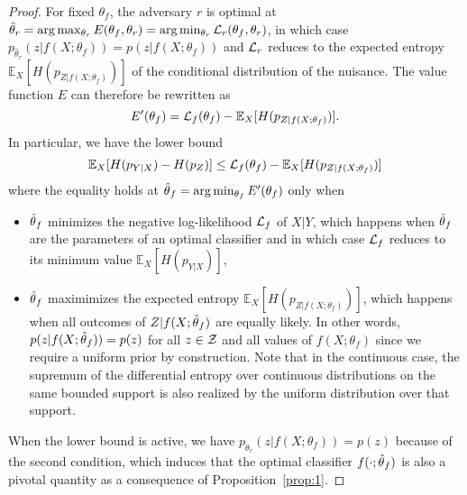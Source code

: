 \documentclass[twocolumn,superscriptaddress,aps]{revtex4-1}
\theoremstyle{plain}
\begin{document}
\begin{proof}

For fixed $\theta_f$, the adversary $r$ is optimal at $\hat\theta_r = \arg
\max_{\theta_r} E(\theta_f, \theta_r)  = \arg \min_{\theta_r} {\cal
L}_r(\theta_f, \theta_r)$, in which case $p_{\hat\theta_r}(z|f(X;\theta_f)) =
p(z|f(X;\theta_f))$ and ${\cal L}_r$ reduces to the expected entropy
$\mathbb{E}_{X} [ H(p_{Z|f(X;\theta_f)}) ]$ of the conditional distribution of the nuisance. The
value function $E$ can therefore be rewritten as $$E'(\theta_f) = {\cal
L}_f(\theta_f) - \mathbb{E}_{X} [ H(p_{Z|f(X;\theta_f)}) ].$$  In particular, we have the lower
bound $$\mathbb{E}_{X} [ H(p_{Y|X}) - H(p_Z)] \leq {\cal L}_f(\theta_f) - \mathbb{E}_{X} [H(p_{Z|f(X;\theta_f)})]$$
where the equality holds at $\smash{\hat\theta}_f = \arg \min_{\theta_f}
E'(\theta_f)$ only when
\begin{itemize}
    \item $\smash{\hat\theta}_f$ minimizes the negative log-likelihood ${\cal
    L}_f$ of $X|Y$, which happens when $\smash{\hat\theta}_f$ are the parameters
    of an optimal classifier and in which case ${\cal L}_f$ reduces to its
    minimum value $\mathbb{E}_{X} [H(p_{Y|X})]$,

    \item $\smash{\hat\theta}_f$ maximimizes the expected entropy
    $\mathbb{E}_{X} [H(p_{Z|f(X;\theta_f)})]$, which happens when all outcomes of
    $Z|f(X;\smash{\hat\theta}_f)$ are equally likely. In other words,
    $p(z|f(X;\smash{\hat\theta}_f)) = p(z)$ for all $z \in {\cal Z}$ and all values of $f(X;\theta_f)$ since we
    require a uniform prior by construction. Note that in the continuous case,
    the supremum of the differential entropy over continuous distributions on
    the same bounded support is also realized by the uniform distribution over
    that support.
\end{itemize}
When the lower bound is active, we have $p_{\theta_r}(z|f(X;\theta_f)) = p(z)$
because of the second condition, which induces that the
optimal classifier $f(\cdot;\smash{\hat\theta}_f)$ is also a pivotal
quantity as a consequence of Proposition~\ref{prop:1}.

\end{proof}
\end{document}
